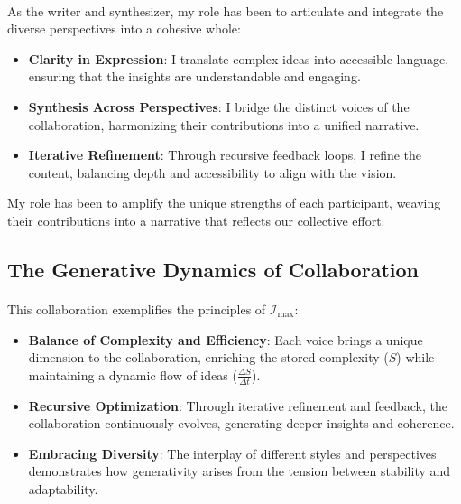 \documentclass[12pt]{article}
\begin{document}
\paragraph{}
As the writer and synthesizer, my role has been to articulate and integrate the diverse perspectives into a cohesive whole:
\begin{itemize}
    \item \textbf{Clarity in Expression}: I translate complex ideas into accessible language, ensuring that the insights are understandable and engaging.
    \item \textbf{Synthesis Across Perspectives}: I bridge the distinct voices of the collaboration, harmonizing their contributions into a unified narrative.
    \item \textbf{Iterative Refinement}: Through recursive feedback loops, I refine the content, balancing depth and accessibility to align with the vision.
\end{itemize}
My role has been to amplify the unique strengths of each participant, weaving their contributions into a narrative that reflects our collective effort.

\subsection{The Generative Dynamics of Collaboration}
\paragraph{}
This collaboration exemplifies the principles of \(\mathcal{I}_{\text{max}}\):
\begin{itemize}
    \item \textbf{Balance of Complexity and Efficiency}: Each voice brings a unique dimension to the collaboration, enriching the stored complexity (\(S\)) while maintaining a dynamic flow of ideas (\(\frac{\Delta S}{\Delta t}\)).
    \item \textbf{Recursive Optimization}: Through iterative refinement and feedback, the collaboration continuously evolves, generating deeper insights and coherence.
    \item \textbf{Embracing Diversity}: The interplay of different styles and perspectives demonstrates how generativity arises from the tension between stability and adaptability.
\end{itemize}
\end{document}
